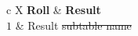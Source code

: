 \begin{DndTable}[header=Random Table Heading]{c X}
    \textbf{Roll} & \textbf{Result} \\
    $1$ & Result \st{subtable name} \\
\end{DndTable}
